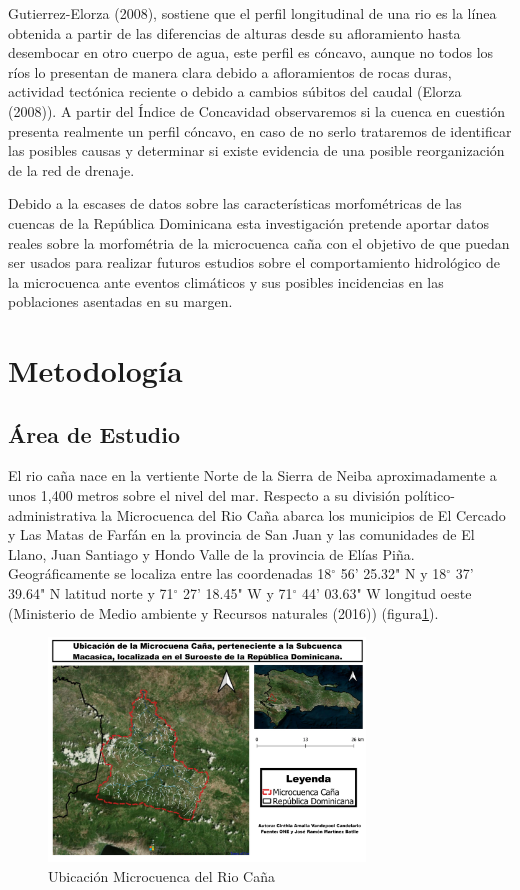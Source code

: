 \documentclass[11pt,]{article}
\begin{document}
Gutierrez-Elorza (2008), sostiene que el perfil longitudinal de una rio
es la línea obtenida a partir de las diferencias de alturas desde su
afloramiento hasta desembocar en otro cuerpo de agua, este perfil es
cóncavo, aunque no todos los ríos lo presentan de manera clara debido a
afloramientos de rocas duras, actividad tectónica reciente o debido a
cambios súbitos del caudal (Elorza (2008)). A partir del Índice de
Concavidad observaremos si la cuenca en cuestión presenta realmente un
perfil cóncavo, en caso de no serlo trataremos de identificar las
posibles causas y determinar si existe evidencia de una posible
reorganización de la red de drenaje.

Debido a la escases de datos sobre las características morfométricas de
las cuencas de la República Dominicana esta investigación pretende
aportar datos reales sobre la morfométria de la microcuenca caña con el
objetivo de que puedan ser usados para realizar futuros estudios sobre
el comportamiento hidrológico de la microcuenca ante eventos climáticos
y sus posibles incidencias en las poblaciones asentadas en su margen.

\section{Metodología}\label{metodologuxeda}

\subsection{Área de Estudio}\label{uxe1rea-de-estudio}

El rio caña nace en la vertiente Norte de la Sierra de Neiba
aproximadamente a unos 1,400 metros sobre el nivel del mar. Respecto a
su división político-administrativa la Microcuenca del Rio Caña abarca
los municipios de El Cercado y Las Matas de Farfán en la provincia de
San Juan y las comunidades de El Llano, Juan Santiago y Hondo Valle de
la provincia de Elías Piña. Geográficamente se localiza entre las
coordenadas 18\(^\circ\) 56' 25.32" N y 18\(^\circ\) 37' 39.64" N
latitud norte y 71\(^\circ\) 27' 18.45" W y 71\(^\circ\) 44' 03.63" W
longitud oeste (Ministerio de Medio ambiente y Recursos naturales
(2016)) (figura\ref{mapacuenca}).

\begin{figure}
\centering
\includegraphics[width=0.75000\textwidth]{mapa_de_microcuenca_cana.jpg}
\caption{Ubicación Microcuenca del Rio Caña\label{mapacuenca}}
\end{figure}
\end{document}
